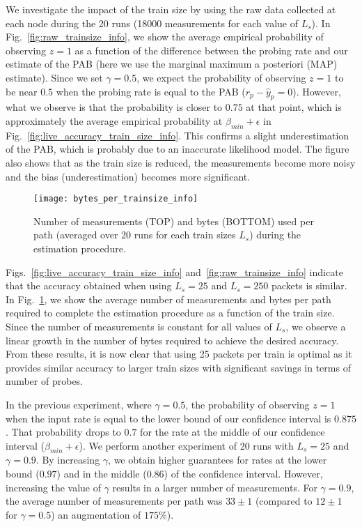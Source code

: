 \documentclass[final,5p,times,twocolumn]{elsarticle}
\begin{document}
We investigate the impact of the train size by using the raw data collected at each node during the 20 runs (18000 measurements for each value of $L_s$).  In Fig.~\ref{fig:raw_trainsize_info}, we show the average empirical probability of observing $z=1$ as a function of the difference between the probing rate and our estimate of the PAB (here we use the marginal maximum a posteriori (MAP) estimate).  Since we set $\gamma=0.5$, we expect the probability of observing $z=1$ to be near $0.5$ when the probing rate is equal to the PAB ($r_p - \hat{y}_p = 0$).  However, what we observe is that the probability is closer to $0.75$ at that point, which is approximately the average empirical probability at $\beta_{min} + \epsilon$ in Fig.~\ref{fig:live_accuracy_train_size_info}.  This confirms a slight underestimation of the PAB, which is probably due to an inaccurate likelihood model.  The figure also shows that as the train size is reduced, the measurements become more noisy and the bias (underestimation) becomes more significant.  

\begin{figure}[!h]
	\centering
	\texttt{[image: bytes\_per\_trainsize\_info]}
	\caption{Number of measurements (TOP) and bytes (BOTTOM) used per path (averaged over 20 runs for each train sizes $L_s$) during the estimation procedure.  \label{fig:bytes_per_trainsize_info}}
\end{figure}

Figs.~\ref{fig:live_accuracy_train_size_info} and~\ref{fig:raw_trainsize_info} indicate that the accuracy obtained when using $L_s=25$ and $L_s=250$ packets is similar.  
In Fig.~\ref{fig:bytes_per_trainsize_info}, we show the average number of measurements and bytes per path required to complete the estimation procedure as a function of the train size.  Since the number of measurements is constant for all values of $L_s$, we observe a linear growth in the number of bytes required to achieve the desired accuracy.  From these results, it is now clear that using 25 packets per train is optimal as it provides similar accuracy to larger train sizes with significant savings in terms of number of probes.



In the previous experiment, where $\gamma=0.5$, the probability of observing $z=1$ when the input rate is equal to the lower bound of our confidence interval is $0.875$.  That probability drops to $0.7$ for the rate at the middle of our confidence interval ($\beta_{min} + \epsilon$).  We perform another experiment of 20 runs with $L_s=25$ and $\gamma=0.9$.  By increasing $\gamma$, we obtain higher guarantees for rates at the lower bound ($0.97$) and in the middle ($0.86$) of the confidence interval.
However, increasing the value of $\gamma$ results in a larger number of measurements.  
For $\gamma=0.9$, the average number of measurements per path was $33\pm1$ (compared to $12\pm1$ for $\gamma=0.5$) an augmentation of $175\%$).  
\end{document}
